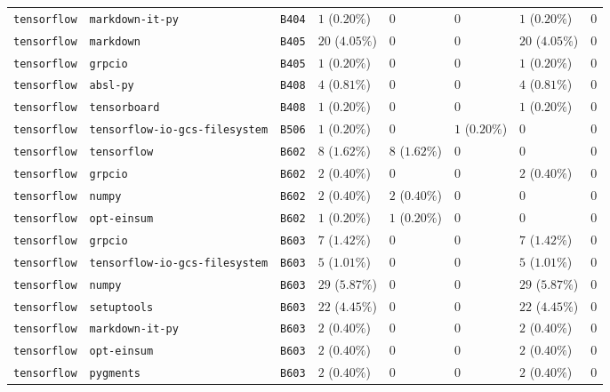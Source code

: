 \begin{table}
\begin{tabular}{llllllll}
\texttt{tensorflow} & \texttt{markdown-it-py} & \texttt{B404} & $1$ ($0.20\%$) & $0$ & $0$ & $1$ ($0.20\%$) & $0$ \\
\texttt{tensorflow} & \texttt{markdown} & \texttt{B405} & $20$ ($4.05\%$) & $0$ & $0$ & $20$ ($4.05\%$) & $0$ \\
\texttt{tensorflow} & \texttt{grpcio} & \texttt{B405} & $1$ ($0.20\%$) & $0$ & $0$ & $1$ ($0.20\%$) & $0$ \\
\texttt{tensorflow} & \texttt{absl-py} & \texttt{B408} & $4$ ($0.81\%$) & $0$ & $0$ & $4$ ($0.81\%$) & $0$ \\
\texttt{tensorflow} & \texttt{tensorboard} & \texttt{B408} & $1$ ($0.20\%$) & $0$ & $0$ & $1$ ($0.20\%$) & $0$ \\
\texttt{tensorflow} & \texttt{tensorflow-io-gcs-filesystem} & \texttt{B506} & $1$ ($0.20\%$) & $0$ & $1$ ($0.20\%$) & $0$ & $0$ \\
\texttt{tensorflow} & \texttt{tensorflow} & \texttt{B602} & $8$ ($1.62\%$) & $8$ ($1.62\%$) & $0$ & $0$ & $0$ \\
\texttt{tensorflow} & \texttt{grpcio} & \texttt{B602} & $2$ ($0.40\%$) & $0$ & $0$ & $2$ ($0.40\%$) & $0$ \\
\texttt{tensorflow} & \texttt{numpy} & \texttt{B602} & $2$ ($0.40\%$) & $2$ ($0.40\%$) & $0$ & $0$ & $0$ \\
\texttt{tensorflow} & \texttt{opt-einsum} & \texttt{B602} & $1$ ($0.20\%$) & $1$ ($0.20\%$) & $0$ & $0$ & $0$ \\
\texttt{tensorflow} & \texttt{grpcio} & \texttt{B603} & $7$ ($1.42\%$) & $0$ & $0$ & $7$ ($1.42\%$) & $0$ \\
\texttt{tensorflow} & \texttt{tensorflow-io-gcs-filesystem} & \texttt{B603} & $5$ ($1.01\%$) & $0$ & $0$ & $5$ ($1.01\%$) & $0$ \\
\texttt{tensorflow} & \texttt{numpy} & \texttt{B603} & $29$ ($5.87\%$) & $0$ & $0$ & $29$ ($5.87\%$) & $0$ \\
\texttt{tensorflow} & \texttt{setuptools} & \texttt{B603} & $22$ ($4.45\%$) & $0$ & $0$ & $22$ ($4.45\%$) & $0$ \\
\texttt{tensorflow} & \texttt{markdown-it-py} & \texttt{B603} & $2$ ($0.40\%$) & $0$ & $0$ & $2$ ($0.40\%$) & $0$ \\
\texttt{tensorflow} & \texttt{opt-einsum} & \texttt{B603} & $2$ ($0.40\%$) & $0$ & $0$ & $2$ ($0.40\%$) & $0$ \\
\texttt{tensorflow} & \texttt{pygments} & \texttt{B603} & $2$ ($0.40\%$) & $0$ & $0$ & $2$ ($0.40\%$) & $0$ \\

\end{tabular}
\end{table}
